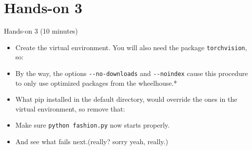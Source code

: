 \documentclass[
  10pt,
  ignorenonframetext,
  aspectratio=169]{beamer}
\newenvironment{Shaded}{\begin{snugshade}}{\end{snugshade}}
\newcommand{\AttributeTok}[1]{\textcolor[rgb]{0.80,0.80,0.80}{#1}}
\newcommand{\ExtensionTok}[1]{\textcolor[rgb]{0.80,0.80,0.80}{#1}}
\newcommand{\KeywordTok}[1]{\textcolor[rgb]{0.94,0.87,0.69}{#1}}
\newcommand{\NormalTok}[1]{\textcolor[rgb]{0.80,0.80,0.80}{#1}}
\newcommand{\PreprocessorTok}[1]{\textcolor[rgb]{1.00,0.81,0.69}{\textbf{#1}}}
\newcommand{\VariableTok}[1]{\textcolor[rgb]{0.80,0.80,0.80}{#1}}
\providecommand{\tightlist}{%
  \setlength{\itemsep}{0pt}\setlength{\parskip}{0pt}}
\begin{document}
\section{Hands-on 3}\label{hands-on-3}

\begin{frame}[fragile]{Hands-on 3 (10 minutes)}
\label{hands-on-3-10-minutes}
\begin{itemize}
\tightlist
\item
  Create the virtual environment. You will also need the package \texttt{torchvision}, so:
\end{itemize}

\begin{Shaded}
\end{Shaded}

\begin{itemize}
\item
  By the way, the options \texttt{-\/-no-downloads} and \texttt{-\/-noindex} cause this procedure to only use optimized packages from the wheelhouse.*
\item
  What pip installed in the default directory, would override the ones in the virtual environment, so remove that:
\end{itemize}

\begin{Shaded}
\end{Shaded}

\begin{itemize}
\item
  Make sure \texttt{python\ fashion.py} now starts properly.

  \pause
\item
  And see what fails next.\pause (really? sorry yeah, really.)
\end{itemize}
\end{frame}
\end{document}
